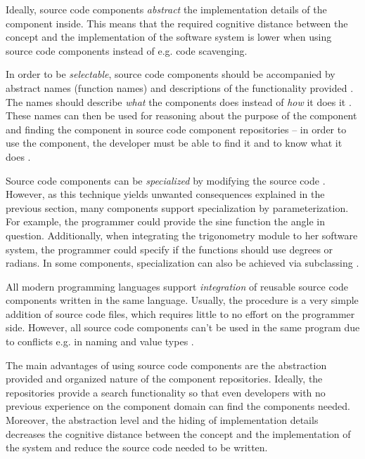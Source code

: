 Ideally, source code components \emph{abstract} the implementation details of the component inside. This means that the required cognitive distance between the concept and the implementation of the software system is lower when using source code components instead of e.g. code scavenging. 

In order to be \emph{selectable}, source code components should be accompanied by abstract names (function names) and descriptions of the functionality provided \citep[chap.~5]{krueger_software_1992}. The names should describe \emph{what} the components does instead of \emph{how} it does it \citep[chap.~5]{krueger_software_1992}. These names can then be used for reasoning about the purpose of the component and finding the component in source code component repositories -- in order to use the component, the developer must be able to find it and to know what it does \citep[chap.~5]{krueger_software_1992}.

Source code components can be \emph{specialized} by modifying the source code \citet[chap.~5]{krueger_software_1992}. However, as this technique yields unwanted consequences explained in the previous section, many components support specialization by parameterization. For example, the programmer could provide the sine function the angle in question. Additionally, when integrating the trigonometry module to her software system, the programmer could specify if the functions should use degrees or radians. In some components, specialization can also be achieved via subclassing \citep[chap.~5]{krueger_software_1992}.

All modern programming languages support \emph{integration} of reusable source code components written in the same language. Usually, the procedure is a very simple addition of source code files, which requires little to no effort on the programmer side. However, all source code components can't be used in the same program due to conflicts e.g. in naming and value types \citep[chap.~5]{krueger_software_1992}.

The main advantages of using source code components are the abstraction provided and organized nature of the component repositories. Ideally, the repositories provide a search functionality so that even developers with no previous experience on the component domain can find the components needed. Moreover, the abstraction level and the hiding of implementation details decreases the cognitive distance between the concept and the implementation of the system and reduce the source code needed to be written.

